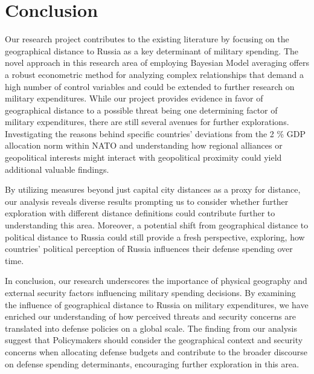 \documentclass[12pt,a4paper]{article}
\begin{document}
\newpage
\section{Conclusion}
Our research project contributes to the existing literature by focusing on the geographical distance to Russia as a key determinant of military spending. The novel approach in this research area of employing Bayesian Model averaging offers a robust econometric method for analyzing complex relationships that demand a high number of control variables and could be extended to further research on military expenditures. 
While our project provides evidence in favor of geographical distance to a possible threat being one determining factor of military expenditures, there are still several avenues for further explorations. Investigating the reasons behind specific countries’ deviations from the 2 \% GDP allocation norm within NATO and understanding how regional alliances or geopolitical interests might interact with geopolitical proximity could yield additional valuable findings. 

By utilizing measures beyond just capital city distances as a proxy for distance, our analysis reveals diverse results prompting us to consider whether further exploration with different distance definitions could contribute further to understanding this area. Moreover, a potential shift from geographical distance to political distance to Russia could still provide a fresh perspective, exploring, how countries’ political perception of Russia influences their defense spending over time.

In conclusion, our research underscores the importance of physical geography and external security factors influencing military spending decisions. By examining the influence of geographical distance to Russia on military expenditures, we have enriched our understanding of how perceived threats and security concerns are translated into defense policies on a global scale. The finding from our analysis suggest that Policymakers should consider the geographical context and security concerns when allocating defense budgets and contribute to the broader discourse on defense spending determinants, encouraging further exploration in this area.  




\clearpage


\setcounter{page}{\thesavepage}
\pagestyle{plain}


\clearpage
\appendix
\end{document}
